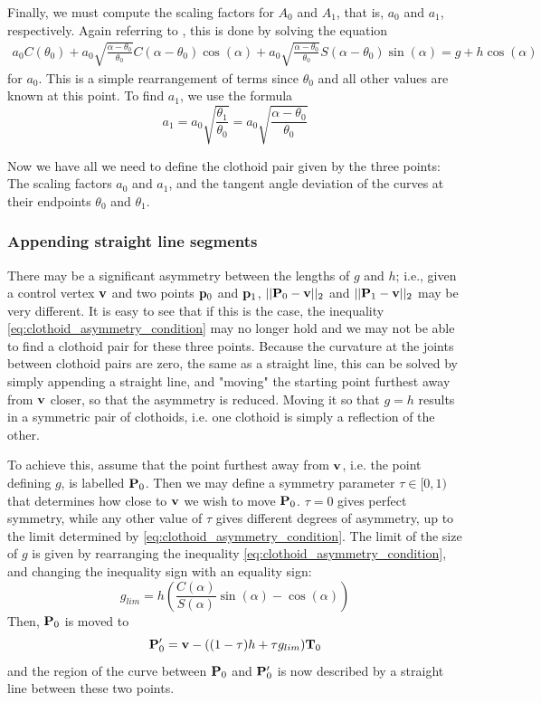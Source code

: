 Finally, we must compute the scaling factors for $A_0$ and $A_1$, that is, $a_0$ and $a_1$, respectively. Again referring to \cite{clothoid}, this is done by solving the equation
\begin{align}
a_0C(\theta_0)+a_0\sqrt{\frac{\alpha-\theta_0}{\theta_0}}C(\alpha-\theta_0)\cos(\alpha) + a_0\sqrt{\frac{\alpha-\theta_0}{\theta_0}}S(\alpha-\theta_0)\sin(\alpha) = g+h\cos(\alpha)\label{eq:a0equation}
\end{align}
for $a_0$. This is a simple rearrangement of terms since $\theta_0$ and all other values are known at this point. To find $a_1$, we use the formula\cite{clothoid}
\begin{equation}
a_1 = a_0 \sqrt{\frac{\theta_1}{\theta_0}} = a_0 \sqrt{\frac{\alpha - \theta_0}{\theta_0}}
\label{eq:a1equation}
\end{equation}

Now we have all we need to define the clothoid pair given by the three points: The scaling factors $a_0$ and $a_1$, and the tangent angle deviation of the curves at their endpoints $\theta_0$ and $\theta_1$.

\subsubsection{Appending straight line segments}
There may be a significant asymmetry between the lengths of $g$ and $h$; i.e., given a control vertex $\mathbf{v}$ and two points $\mathbf{p}_0$ and $\mathbf{p}_1$, $||{\mathbf P}_0-\mathbf{v}||_2$ and $||{\mathbf P}_1-\mathbf{v}||_2$ may be very different. It is easy to see that if this is the case, the inequality \ref{eq:clothoid_asymmetry_condition} may no longer hold and we may not be able to find a clothoid pair for these three points. Because the curvature at the joints between clothoid pairs are zero, the same as a straight line, this can be solved by simply appending a straight line, and "moving" the starting point furthest away from ${\mathbf v}$ closer, so that the asymmetry is reduced. Moving it so that $g=h$ results in a symmetric pair of clothoids, i.e. one clothoid is simply a reflection of the other.\cite{clothoid}

To achieve this, assume that the point furthest away from ${\mathbf v}$, i.e. the point defining $g$, is labelled ${\mathbf P}_0$. Then we may define a symmetry parameter $\tau\in [0, 1)$ that determines how close to ${\mathbf v}$ we wish to move ${\mathbf P}_0$. $\tau=0$ gives perfect symmetry, while any other value of $\tau$ gives different degrees of asymmetry, up to the limit determined by \ref{eq:clothoid_asymmetry_condition}. The limit of the size of $g$ is given by rearranging the inequality \ref{eq:clothoid_asymmetry_condition}, and changing the inequality sign with an equality sign:
\begin{equation}
g_{lim} = h\left(\frac{C(\alpha)}{S(\alpha)}\sin(\alpha) - \cos(\alpha)\right)
\end{equation}
Then, ${\mathbf P}_0$ is moved to 
\begin{equation}
{\mathbf P}_0^\prime = {\mathbf v}-((1-\tau)h + \tau g_{lim}){\mathbf T}_0
\end{equation}
and the region of the curve between ${\mathbf P}_0$ and ${\mathbf P}_0^\prime$ is now described by a straight line between these two points. 


